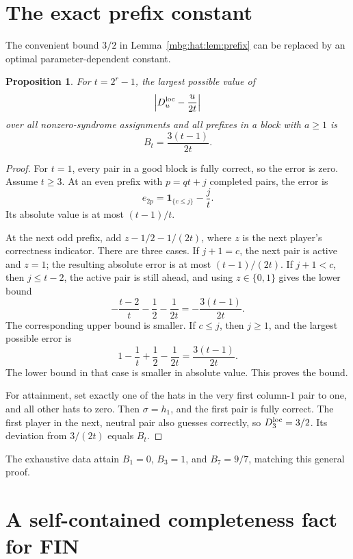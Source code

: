 \documentclass[11pt,letterpaper]{article}
\newtheorem{proposition}[theorem]{Proposition}
\theoremstyle{definition}
\newcommand{\ind}{\mathbf 1}
\begin{document}
\section{The exact prefix constant}
\label{mbg:hat:app:prefix}

The convenient bound \(3/2\) in Lemma~\ref{mbg:hat:lem:prefix} can be
replaced by an optimal parameter-dependent constant.

\begin{proposition}\label{mbg:hat:prop:sharp-prefix}
For \(t=2^r-1\), the largest possible value of
\[
  \left|D^{\rm loc}_u-\frac{u}{2t}\right|
\]
over all nonzero-syndrome assignments and all prefixes in a block
with \(a\ge1\) is
\[
  B_t=\frac{3(t-1)}{2t}.
\]
\end{proposition}
\begin{proof}
For \(t=1\), every pair in a good block is fully correct, so the
error is zero. Assume \(t\ge3\).
At an even prefix with \(p=qt+j\) completed pairs,
the error is
\[
  e_{2p}=\ind_{\{c\le j\}}-\frac jt.
\]
Its absolute value is at most \((t-1)/t\).

At the next odd prefix, add
\(z-1/2-1/(2t)\), where \(z\) is the next player's correctness
indicator. There are three cases.
If \(j+1=c\), the next pair is active and \(z=1\); the
resulting absolute error is at most \((t-1)/(2t)\).
If \(j+1<c\), then \(j\le t-2\), the active pair is still ahead,
and using \(z\in\{0,1\}\) gives the lower bound
\[
  -\frac{t-2}{t}-\frac12-\frac1{2t}
  =-\frac{3(t-1)}{2t}.
\]
The corresponding upper bound is smaller.
If \(c\le j\), then \(j\ge1\), and the largest possible error is
\[
  1-\frac1t+\frac12-\frac1{2t}
  =\frac{3(t-1)}{2t}.
\]
The lower bound in that case is smaller in absolute value.
This proves the bound.

For attainment, set exactly one of the hats in the very first
column-\(1\) pair to one, and all other hats to zero.
Then \(\sigma=h_1\), and the first pair is fully correct.
The first player in the next, neutral pair also guesses correctly,
so \(D^{\rm loc}_3=3/2\). Its deviation from \(3/(2t)\) equals
\(B_t\).
\end{proof}

The exhaustive data attain \(B_1=0\), \(B_3=1\), and
\(B_7=9/7\), matching this general proof.

\section{A self-contained completeness fact for FIN}
\label{mbg:hat:app:fin}
\end{document}
